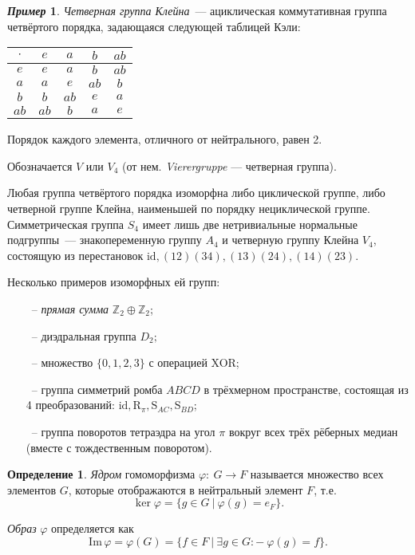 \documentclass[a4paper, 14pt]{extarticle}
\newcommand{\n}{\par}
\newcommand{\integers}{\mathbb{Z}}
\newcommand{\suchthat}{{:}{-} \ }
\newcommand{\im}{\mathrm{Im} \,}
\newcommand{\id}{\mathrm{id}}
\newcommand{\Rot}{\mathrm{R}}
\newcommand{\Sym}{\mathrm{S}}
\renewcommand{\phi}{\varphi}
\theoremstyle{definition}
\newtheorem*{exmpl*}{\textit{Пример}}
\newtheorem{definition}{Определение}
\theoremstyle{plain}
\numberwithin{theorem}{section}
\numberwithin{definition}{section}
\numberwithin{statement}{section}
\numberwithin{lemma}{section}
\numberwithin{consequence}{section}
\begin{document}
	\newpage
	\begin{exmpl*}
		\textit{Четверная группа Клейна}~--- ациклическая коммутативная группа четвёртого порядка, задающаяся следующей таблицей Кэли: \n
		
		\begin{center}
			\begin{tabular}{c |c c c c}
				$\cdot$ & $e$ & $a$ & $b$ & $ab$\\
				\hline
				$e$ & $e$ & $a$ & $b$ & $ab$\\
				
				$a$ & $a$ & $e$ & $ab$ & $b$\\
				
				$b$ & $b$ & $ab$ & $e$ & $a$\\
				
				$ab$ & $ab$ & $b$ & $a$ & $e$\\
			\end{tabular}
		\end{center} \n
		Порядок каждого элемента, отличного от нейтрального, равен 2. \n
		Обозначается $V$ или $V_4$ (от нем. \textit{Vierergruppe} — четверная группа). \n
		Любая группа четвёртого порядка изоморфна либо циклической группе, либо четверной группе Клейна, наименьшей по порядку нециклической группе. Симметрическая группа $S_4$ имеет лишь две нетривиальные нормальные подгруппы~--- знакопеременную группу $A_4$ и четверную группу Клейна $V_4$, состоящую из перестановок ${\mathrm{id}, (12)(34), (13)(24), (14)(23).}$ \n
		Несколько примеров изоморфных ей групп:
		\begin{itemize}
			\setlength\itemsep{0.1em}
			\item[~--] \textit{прямая сумма} $\integers_2 \oplus \integers_2$;
			\item[~--] диэдральная группа $D_2;$
			\item[~--] множество ${\{0, 1, 2, 3\}}$ с операцией XOR;
			\item[~--] группа симметрий ромба $ABCD$ в трёхмерном пространстве, состоящая из 4 преобразований: ${\id, \Rot_\pi, \Sym_{AC}, \Sym_{BD}}$;
			\item[~--] группа поворотов тетраэдра на угол $\pi$ вокруг всех трёх рёберных медиан (вместе с тождественным поворотом).
		\end{itemize}
	\end{exmpl*}
	\newpage
	\begin{definition}
		\textit{Ядром} гомоморфизма ${\phi{:} \ G \rightarrow F}$ называется множество всех элементов $G$, которые отображаются в нейтральный элемент $F$, т.е.
		\begin{equation*}
			\ker \phi = \{g \in G \ | \ \phi(g) = e_F\}.
		\end{equation*} \n
		\textit{Образ} $\phi$ определяется как
		\begin{equation*}
			\im \phi = \phi(G) = \{f \in F \ | \ \exists g \in G \suchthat \phi(g) = f\}.
		\end{equation*}
	\end{definition}
\end{document}
